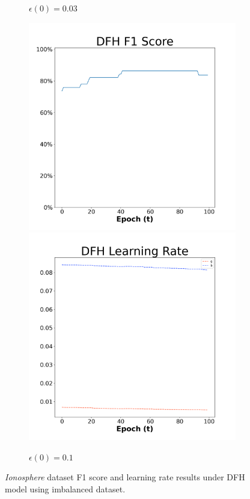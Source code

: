 \begin{figure}[H]
\begin{subfigure}{0.3\textwidth}
  \caption{$\epsilon(0)=0.03$}
\end{subfigure}\hfil %
\begin{subfigure}{0.3\textwidth}
  \includegraphics[width=\linewidth]{images/exper2/Ionosphere/DFH_0.1_f1.png}
  \includegraphics[width=\linewidth]{images/exper2/Ionosphere/DFH_0.1_lr.png}
  \caption{$\epsilon(0)=0.1$}
\end{subfigure}

\caption{\textit{Ionosphere} dataset F1 score and learning rate results under DFH model using imbalanced dataset.}
\end{figure}

